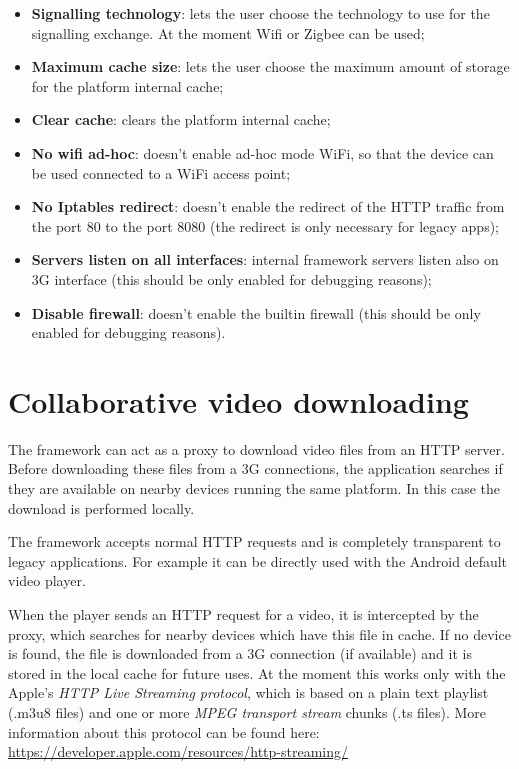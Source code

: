 \documentclass[12pt, a4paper, oneside]{book}
\begin{document}
\begin{itemize}
\item \textbf{Signalling technology}: lets the user choose the technology to use for the signalling exchange. At the moment Wifi or Zigbee can be used;
\item \textbf{Maximum cache size}: lets the user choose the maximum amount of storage for the platform internal cache;
\item \textbf{Clear cache}: clears the platform internal cache;
\item \textbf{No wifi ad-hoc}: doesn't enable ad-hoc mode WiFi, so that the device can be used connected to a WiFi access point;
\item \textbf{No Iptables redirect}: doesn't enable the redirect of the HTTP traffic from the port 80 to the port 8080 (the redirect is only necessary for legacy apps);
\item \textbf{Servers listen on all interfaces}: internal framework servers listen also on 3G interface (this should be only enabled for debugging reasons);
\item \textbf{Disable firewall}: doesn't enable the builtin firewall (this should be only enabled for debugging reasons).
\end{itemize}

\chapter{Collaborative video downloading}
The framework can act as a proxy to download video files from an HTTP server. Before downloading these files from a 3G connections, the application searches if they are available on nearby devices running the same platform. In this case the download is performed locally.

The framework accepts normal HTTP requests and is completely transparent to legacy applications. For example it can be directly used with the Android default video player.

When the player sends an HTTP request for a video, it is intercepted by the proxy, which searches for nearby devices which have this file in cache. If no device is found, the file is downloaded from a 3G connection (if available) and it is stored in the local cache for future uses. At the moment this works only with the Apple's \textit{HTTP Live Streaming protocol}, which is based on a plain text playlist (.m3u8 files) and one or more \textit{MPEG transport stream} chunks (.ts files). More information about this protocol can be found here: \href{https://developer.apple.com/resources/http-streaming/}{https://developer.apple.com/resources/http-streaming/}
\end{document}
